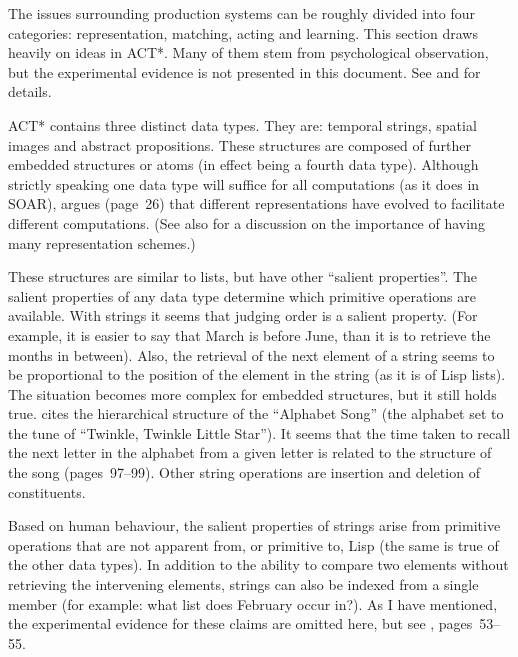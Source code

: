 \label{issue}%

The issues surrounding production systems can be roughly divided into
four categories: representation, matching, acting and learning.  This
section draws heavily on ideas in ACT*.  Many of them stem from
psychological observation, but the experimental evidence is not
presented in this document. See  and 
for details.


ACT* contains three distinct data types. They are: temporal strings,
spatial images and abstract propositions.   These structures are
composed of further embedded structures or atoms (in effect being a
fourth data type).  Although strictly speaking one data type will
suffice for all computations (as it does in SOAR), 
argues (page~26) that different representations have evolved to
facilitate different computations.  (See also  for a
discussion on the importance of having many representation schemes.)

 These structures are similar to lists, but
have other ``salient properties''.  The salient properties of any data
type determine which primitive operations are available. With strings
it seems that judging order is a salient property. (For example, it is
easier to say that March is before June, than it is to retrieve the
months in between).  Also, the retrieval of the next element of a
string seems to be proportional to the position of the element in the
string (as it is of Lisp lists). The situation becomes more complex
for embedded structures, but it still holds true.  
cites the hierarchical structure of the ``Alphabet Song'' (the
alphabet set to the tune of ``Twinkle, Twinkle Little Star''). It
seems that the time taken to recall the next letter in the alphabet
from a given letter is related to the structure of the song
(pages~97--99). Other string operations are insertion and deletion of
constituents.

Based on human behaviour, the salient properties of strings arise from
primitive operations that are not apparent from, or primitive to, Lisp
(the same is true of the other data types). In addition to the ability
to compare two elements without retrieving the intervening elements,
strings can also be indexed from a single member (for example: what
list does February occur in?).  As I have mentioned, the experimental
evidence for these claims are omitted here, but see ,
pages~53--55.

